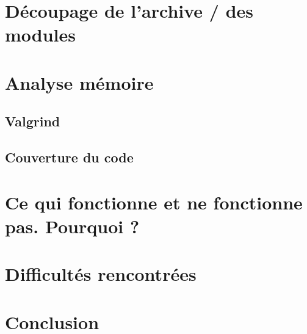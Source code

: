 \documentclass{report}
\begin{document}
\chapter{Découpage de l'archive /  des modules}

\chapter{Analyse mémoire}
\section{Valgrind}
\section{Couverture du code} 

\chapter{Ce qui fonctionne et ne fonctionne pas. Pourquoi ?}

\chapter{Difficultés rencontrées}

\chapter*{Conclusion}

\end{document}
